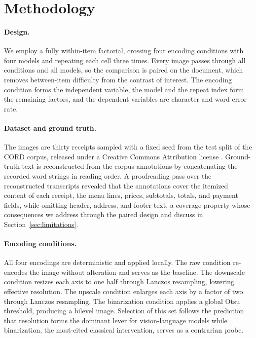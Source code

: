 \documentclass[11pt]{article}
\begin{document}
\section{Methodology}

\paragraph{Design.}
We employ a fully within-item factorial, crossing four encoding conditions with four models and
repeating each cell three times. Every image passes through all conditions and all models, so the
comparison is paired on the document, which removes between-item difficulty from the contrast of
interest. The encoding condition forms the independent variable, the model and the repeat index form
the remaining factors, and the dependent variables are character and word error rate.

\paragraph{Dataset and ground truth.}
The images are thirty receipts sampled with a fixed seed from the test split of the CORD corpus,
released under a Creative Commons Attribution license \citep{park2019cord}. Ground-truth text is
reconstructed from the corpus annotations by concatenating the recorded word strings in reading
order. A proofreading pass over the reconstructed transcripts revealed that the annotations cover
the itemized content of each receipt, the menu lines, prices, subtotals, totals, and payment fields,
while omitting header, address, and footer text, a coverage property whose consequences we address
through the paired design and discuss in Section~\ref{sec:limitations}.

\paragraph{Encoding conditions.}
All four encodings are deterministic and applied locally. The raw condition re-encodes the image
without alteration and serves as the baseline. The downscale condition resizes each axis to one half
through Lanczos resampling, lowering effective resolution. The upscale condition enlarges each axis
by a factor of two through Lanczos resampling. The binarization condition applies a global Otsu
threshold, producing a bilevel image. Selection of this set follows the prediction that resolution
forms the dominant lever for vision-language models while binarization, the most-cited classical
intervention, serves as a contrarian probe.
\end{document}
